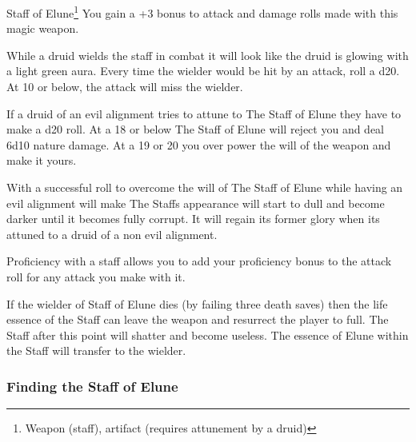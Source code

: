 \begin{commentbox}{Staff of Elune\footnote{Weapon (staff), artifact (requires attunement by a druid)}}	
	You gain a +3 bonus to attack and damage rolls made with this magic weapon. 
	
	While a druid wields the staff in combat it will look like the druid is glowing with a light green aura. Every time the wielder would be hit by an attack, roll a d20. At 10 or below, the attack will miss the wielder.
	
	If a druid of an evil alignment tries to attune to The Staff of Elune they have to make a d20 roll. At a 18 or below The Staff of Elune will reject you and deal 6d10 nature damage. At a 19 or 20 you over power the will of the weapon and make it yours.
	
	With a successful roll to overcome the will of The Staff of Elune while having an evil alignment will make The Staffs appearance will start to dull and become darker until it becomes fully corrupt. It will regain its former glory when its attuned to a druid of a non evil alignment.
	
	Proficiency with a staff allows you to add your proficiency bonus to the attack roll for any attack you make with it.
	
	If the wielder of Staff of Elune dies (by failing three death saves) then the life essence of the Staff can leave the weapon and resurrect the player to full. The Staff after this point will shatter and become useless. The essence of Elune within the Staff will transfer to the wielder.
\end{commentbox}


\subsubsection{Finding the Staff of Elune}

